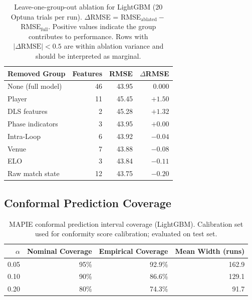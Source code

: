 \documentclass[12pt,a4paper,oneside]{report}
\begin{document}
\begin{table}[htbp]
\centering
\caption[Feature group ablation study (LightGBM)]{Leave-one-group-out ablation for LightGBM (20 Optuna trials per run).  $\Delta$RMSE = RMSE$_\text{ablated} -$ RMSE$_\text{full}$.  Positive values indicate the group contributes to performance.  Rows with $|\Delta\text{RMSE}| < 0.5$ are within ablation variance and should be interpreted as marginal.}
\label{tab:ablation}
\small
\begin{tabular}{lrrr}
\toprule
\textbf{Removed Group} & \textbf{Features} & \textbf{RMSE} & $\Delta$\textbf{RMSE} \\
\midrule
None (full model)   & 46 & 43.95 & 0.000 \\
\midrule
Player              & 11 & 45.45 & $+1.50$ \\
DLS features        &  2 & 45.28 & $+1.32$ \\
Phase indicators    &  3 & 43.95 & $+0.00$ \\
Intra-Loop          &  6 & 43.92 & $-0.04$ \\
Venue               &  7 & 43.88 & $-0.08$ \\
ELO                 &  3 & 43.84 & $-0.11$ \\
Raw match state     & 12 & 43.75 & $-0.20$ \\
\bottomrule
\end{tabular}
\end{table}

\subsection{Conformal Prediction Coverage}

\begin{table}[htbp]
\centering
\caption[Conformal prediction interval coverage]{MAPIE conformal prediction interval coverage (LightGBM).  Calibration set used for conformity score calibration; evaluated on test set.}
\label{tab:conformal}
\small
\begin{tabular}{rrrr}
\toprule
\textbf{$\alpha$} & \textbf{Nominal Coverage} & \textbf{Empirical Coverage} & \textbf{Mean Width (runs)} \\
\midrule
0.05 & 95\% & 92.9\% & 162.9 \\
0.10 & 90\% & 86.6\% & 129.1 \\
0.20 & 80\% & 74.3\% & \phantom{0}91.7 \\
\bottomrule
\end{tabular}
\end{table}
\end{document}
